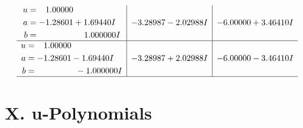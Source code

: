 \documentclass[1p]{elsarticle_modified}
\theoremstyle{definition}
\begin{document}
$$\begin{array}{c|c|c}
\begin{aligned}
u &= \phantom{-}1.00000\phantom{ +0.000000I} \\
a &= -1.28601 + 1.69440 I \\
b &= \phantom{-0.000000 -}1.000000 I\end{aligned}
 & -3.28987 - 2.02988 I & -6.00000 + 3.46410 I \\ \hline\begin{aligned}
u &= \phantom{-}1.00000\phantom{ +0.000000I} \\
a &= -1.28601 - 1.69440 I \\
b &= \phantom{-0.000000 } -1.000000 I\end{aligned}
 & -3.28987 + 2.02988 I & -6.00000 - 3.46410 I\\
 \hline 
 \end{array}$$\newpage
\newpage\renewcommand{\arraystretch}{1}
\centering \section*{ X. u-Polynomials}
\end{document}
